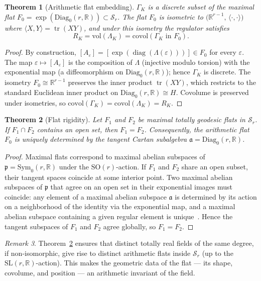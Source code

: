 \documentclass[12pt]{article}
\newtheorem{theorem}{Theorem}[section]
\theoremstyle{definition}
\theoremstyle{remark}
\newtheorem{remark}[theorem]{Remark}
\newcommand{\R}{\mathbb{R}}
\newcommand{\SL}{\mathrm{SL}}
\newcommand{\SO}{\mathrm{SO}}
\newcommand{\Symz}{\mathrm{Sym}_{0}}
\newcommand{\Diagz}{\mathrm{Diag}_{0}}
\newcommand{\calM}{\mathcal{S}}
\newcommand{\tr}{\operatorname{tr}}
\newcommand{\diag}{\operatorname{diag}}
\begin{document}
\begin{theorem}[Arithmetic flat embedding]
\label{thm:flatembedding}
$\Gamma_K$ is a discrete subset of the maximal flat
$F_0 = \exp(\Diagz(r,\R)) \subset \calM_r$.
The flat $F_0$ is isometric to $\bigl(\R^{r-1},\,\langle\cdot,\cdot\rangle\bigr)$
where $\langle X,Y\rangle = \tr(XY)$,
and under this isometry the regulator satisfies
\[
  R_K = \mathrm{vol}(\Lambda_K) = \mathrm{covol}(\Gamma_K \text{ in } F_0).
\]
\end{theorem}

\begin{proof}
By construction, $[A_\varepsilon] = [\exp(\diag(\Lambda(\varepsilon)))]
\in F_0$ for every $\varepsilon$.
The map $\varepsilon \mapsto [A_\varepsilon]$ is the composition of
$\Lambda$ (injective modulo torsion) with the exponential map
(a diffeomorphism on $\Diagz(r,\R)$); hence $\Gamma_K$ is discrete.
The isometry $F_0 \cong \R^{r-1}$ preserves the inner product
$\tr(XY)$, which restricts to the standard Euclidean inner product on
$\Diagz(r,\R) \cong H$.
Covolume is preserved under isometries, so
$\mathrm{covol}(\Gamma_K) = \mathrm{covol}(\Lambda_K) = R_K$.
\end{proof}

\begin{theorem}[Flat rigidity]
\label{thm:rigidity}
Let $F_1$ and $F_2$ be maximal totally geodesic flats in $\calM_r$.
If $F_1 \cap F_2$ contains an open set, then $F_1 = F_2$.
Consequently, the arithmetic flat $F_0$ is uniquely determined by the
tangent Cartan subalgebra $\mathfrak{a} = \Diagz(r,\R)$.
\end{theorem}

\begin{proof}
Maximal flats correspond to maximal abelian subspaces
of $\mathfrak{p} = \Symz(r,\R)$
under the $\SO(r)$-action.
If $F_1$ and $F_2$ share an open subset,
their tangent spaces coincide at some interior point.
Two maximal abelian subspaces of $\mathfrak{p}$ that agree on
an open set in their exponential images must coincide:
any element of a maximal abelian subspace $\mathfrak{a}$
is determined by its action on a neighborhood of the identity
via the exponential map, and a maximal abelian subspace containing
a given regular element is unique~\cite[Ch.~V, Thm.~6.2]{Helgason}.
Hence the tangent subspaces of $F_1$ and $F_2$ agree globally,
so $F_1 = F_2$.
\end{proof}

\begin{remark}
Theorem~\ref{thm:rigidity} ensures that distinct totally real fields
of the same degree, if non-isomorphic, give rise to distinct arithmetic
flats inside $\calM_r$ (up to the $\SL(r,\R)$-action).
This makes the geometric data of the flat — its shape, covolume, and
position — an arithmetic invariant of the field.
\end{remark}
\end{document}
